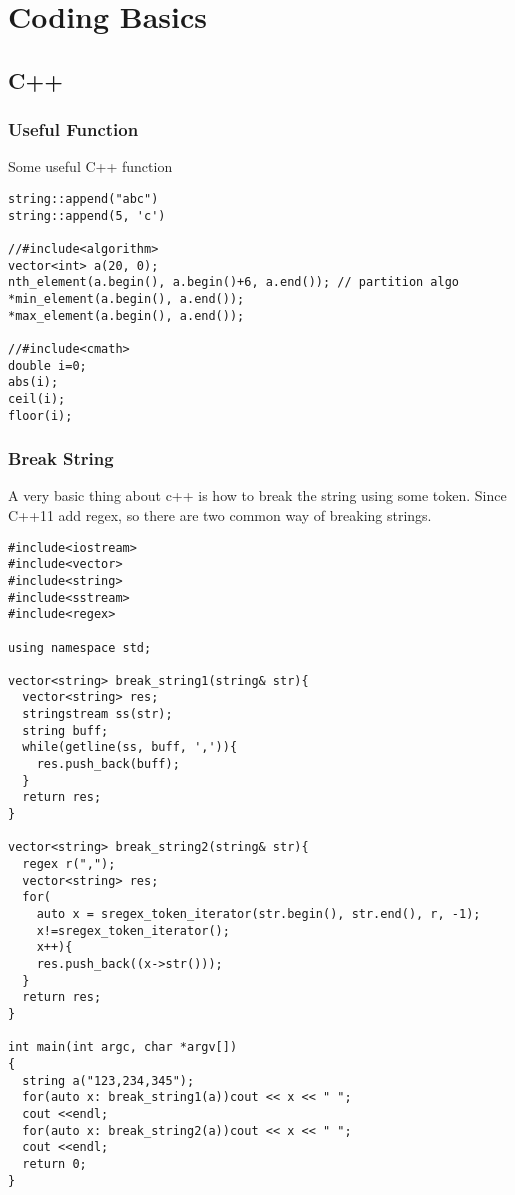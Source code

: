 \newpage
\section{Coding Basics}
\subsection{C++}

\subsubsection{Useful Function}

Some useful C++ function

\begin{lstlisting}
string::append("abc")
string::append(5, 'c')

//#include<algorithm>
vector<int> a(20, 0);
nth_element(a.begin(), a.begin()+6, a.end()); // partition algo
*min_element(a.begin(), a.end());
*max_element(a.begin(), a.end());

//#include<cmath>
double i=0;
abs(i);
ceil(i);
floor(i);
\end{lstlisting}


\subsubsection{Break String}
A very basic thing about c++ is how to break the string using some token. Since C++11 add regex, so there are two common way of breaking strings.

\begin{lstlisting}
#include<iostream>
#include<vector>
#include<string>
#include<sstream>
#include<regex>

using namespace std;

vector<string> break_string1(string& str){
  vector<string> res;
  stringstream ss(str);
  string buff;
  while(getline(ss, buff, ',')){
    res.push_back(buff);
  }
  return res;
}

vector<string> break_string2(string& str){
  regex r(",");
  vector<string> res;
  for(
    auto x = sregex_token_iterator(str.begin(), str.end(), r, -1);
    x!=sregex_token_iterator();
    x++){
    res.push_back((x->str()));
  }
  return res;
}

int main(int argc, char *argv[])
{
  string a("123,234,345");
  for(auto x: break_string1(a))cout << x << " ";
  cout <<endl;
  for(auto x: break_string2(a))cout << x << " ";
  cout <<endl;
  return 0;
}
\end{lstlisting}

